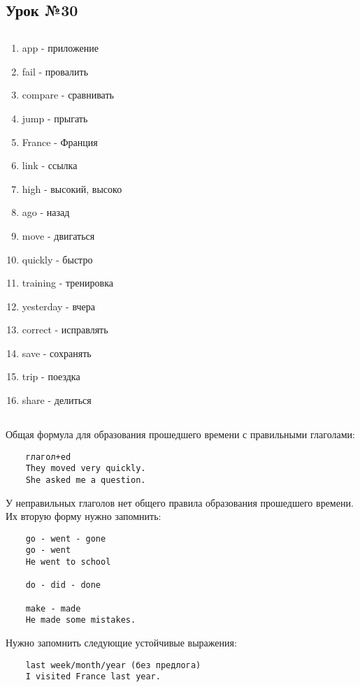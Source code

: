 \subsection{Урок №30}

\subsection*{}
\begin{multicols}{2}
    \begin{enumerate}\setlength{\itemsep}{0pt}
        \item app - приложение
        \item fail - провалить
        \item compare - сравнивать
        \item jump - прыгать
        \item France - Франция
        \item link - ссылка
        \item high - высокий, высоко
        \item ago - назад
        \item move - двигаться
        \item quickly - быстро
        \item training - тренировка
        \item yesterday - вчера
        \item correct - исправлять
        \item save - сохранять
        \item trip - поездка
        \item share - делиться
    \end{enumerate}
\end{multicols}

\subsection*{}
Общая формула для образования прошедшего времени с правильными глаголами:
\begin{verbatim}
    глагол+ed
    They moved very quickly.
    She asked me a question.
\end{verbatim}

У неправильных глаголов нет общего правила образования прошедшего времени. Их вторую форму нужно запомнить:
\begin{verbatim}
    go - went - gone
    go - went
    He went to school

    do - did - done

    make - made
    He made some mistakes.
\end{verbatim}

Нужно запомнить следующие устойчивые выражения:
\begin{verbatim}
    last week/month/year (без предлога)
    I visited France last year.
\end{verbatim}